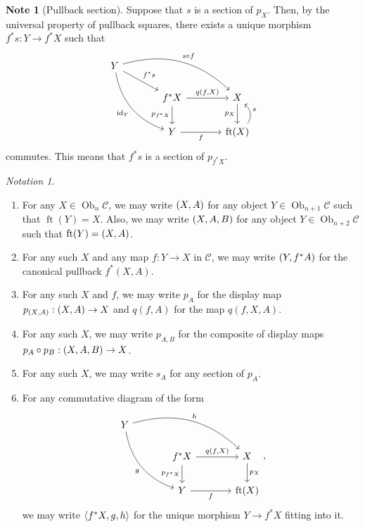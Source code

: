 \documentclass[10pt,letterpaper,cm]{nupset}
\theoremstyle{definition}
\newtheorem{note}[definition]{Note}
\theoremstyle{theorem}
\theoremstyle{remark}
\newtheorem*{notation}{Notation}
\DeclareMathOperator{\ft}{ft}
\DeclareMathOperator{\ob}{Ob}
\newcommand{\0}{\mathbf{0}}
\newcommand{\1}{\mathbf{1}}
\newcommand{\2}{\mathbf{2}}
\renewcommand{\c}{\mathscr{C}}
\DeclareMathOperator{\idd}{id}
\newcommand{\be}{\begin{enumerate}}
\newcommand{\ee}{\end{enumerate}}
\begin{document}
\begin{note}[Pullback section]
Suppose that $s$ is a section of $p_X$. Then, by the universal property of pullback squares, there exists a unique morphism $f^{\ast}{s} : Y \to f^{\ast}{X}$ such that
\[
\begin{tikzcd}[column sep=large]
Y \arrow[rd, "f^{\ast}{s}"] \arrow[rdd, "\idd_Y"', bend right] \arrow[rrd, "s\circ f", bend left] &                                                                  &                    \\
                                                                                              & f^{\ast}{X} \arrow[d, "p_{f^{\ast}{X}}"'] \arrow[r, "{q(f,X)}"] & X \arrow[d, "p_X"'] \\
                                                                                              & Y \arrow[r, "f"']                                                & \ft(X) \arrow[u, "s"', bend right=49]         
\end{tikzcd}
\] commutes. This means that $f^{\ast}{s}$ is a section of $p_{f^{\ast}{X}}$.
\end{note}

\begin{notation}\label{bignot} $ $
\be
\item For any $X\in \ob_{n}{\c}$, we may write $\mleft(X, A\mright)$ for any object $Y \in \ob_{n+1}{\c}$ such that $\ft(Y) = X$. Also, we may write $\mleft(X, A, B\mright)$ for any object $Y \in \ob_{n+2}{\c}$ such that $\ft(Y) = \mleft(X, A\mright)$. 
\item For any such $X$ and any map $f: Y \to X$ in $\c$, we may write $\mleft(Y, f^{\ast}{A}\mright)$ for the canonical pullback $f^{\ast}(X, A)$.
\item For any such $X$ and $f$, we may write $p_A$ for the display map $p_{(X,A)} : \mleft(X, A\mright) \to X$ and $q(f, A)$ for the map $q(f,X,A)$.
\item For any such $X$, we may write $p_{A,B}$ for the composite of display maps $p_A\circ p_B : \mleft(X, A, B\mright) \to X$.
\item For any such $X$, we may write $s_{A}$ for any section of $p_A$.  
\item For any commutative diagram of the form
\[
\begin{tikzcd}[column sep=large]
Y  \arrow[rdd, "g"', bend right] \arrow[rrd, "h", bend left] &                                                                  &                    \\
                                                                                              & f^{\ast}{X} \arrow[d, "p_{f^{\ast}{X}}"'] \arrow[r, "{q(f,X)}"] & X \arrow[d, "p_X"] \\
                                                                                              & Y \arrow[r, "f"']                                                & \ft(X)          
\end{tikzcd}
,\] we may write $\mleft\langle f^{\ast}{X}, g, h \mright\rangle$ for the unique morphism $Y \to f^{\ast}{X}$ fitting into it.
\ee
\end{notation}
\end{document}
